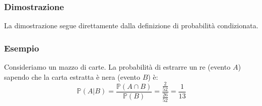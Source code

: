 \documentclass{article}
\begin{document}
\subsubsection{Dimostrazione}
La dimostrazione segue direttamente dalla definizione di probabilità condizionata.

\subsubsection{Esempio}
Consideriamo un mazzo di carte. La probabilità di estrarre un re (evento \(A\)) sapendo che la carta estratta è nera (evento \(B\)) è:
\[
    \mathbb{P}(A | B) = \frac{\mathbb{P}(A \cap B)}{\mathbb{P}(B)} = \frac{\frac{2}{52}}{\frac{26}{52}} = \frac{1}{13}
\]

\end{document}
